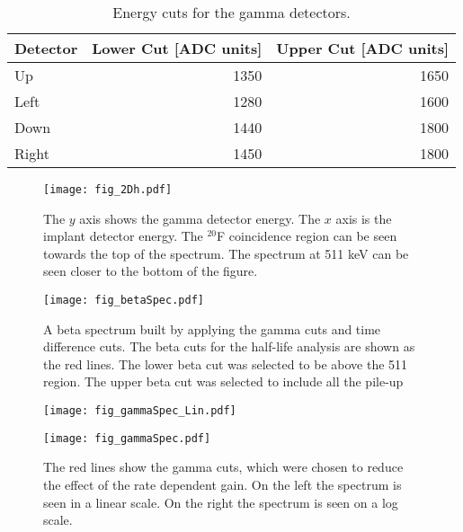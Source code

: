 \documentclass[MaxHughesThesis.tex]{subfiles}
\begin{document}
\begin{table}[!htb]
	\centering
	\caption{Energy cuts for the gamma detectors.}
	\begin{tabular}{lrr}
	Detector & Lower Cut [ADC units] & Upper Cut [ADC units] \\ \hline
	Up & 1350 & 1650 \\
	Left & 1280 & 1600\\
	Down & 1440 & 1800 \\
	Right & 1450 & 1800
	\end{tabular}
	\label{tab:GammaCuts}
\end{table}

\begin{figure}[!htb]
	\centerline{\texttt{[image: fig\_2Dh.pdf]}}
	\caption{The $y$ axis shows the gamma detector energy.
		   The $x$ axis is the implant detector energy.
		   The $^{20}$F coincidence region can be seen towards the top of the spectrum.
		   The spectrum at 511 keV can be seen closer to the bottom of the figure.
		   }
	\label{fig:2DGraph}
\end{figure}

\begin{figure}[!htb]
	\centerline{\texttt{[image: fig\_betaSpec.pdf]}}
	\caption{
		 A beta spectrum built by applying the gamma cuts and time difference cuts. 
		 The beta cuts for the half-life analysis are shown as the red lines.
		 The lower beta cut was selected to be above the 511 region.
		 The upper beta cut was selected to include all the pile-up}
	
	\label{fig:BetaGraph}
\end{figure}

\begin{figure}[!htb]
        \centering
        \begin{minipage}{0.50\textwidth}
            \centerline{\texttt{[image: fig\_gammaSpec\_Lin.pdf]}}
        \end{minipage}\hfill
        \begin{minipage}{0.50\textwidth}
            \centerline{\texttt{[image: fig\_gammaSpec.pdf]}}
        \end{minipage}
	\caption{The red lines show the gamma cuts, which were chosen to reduce the effect of the rate dependent gain. 
		 On the left the spectrum is seen in a linear scale.
		 On the right the spectrum is seen on a log scale.}
	\label{fig:GammaGraph}
\end{figure}
\end{document}
